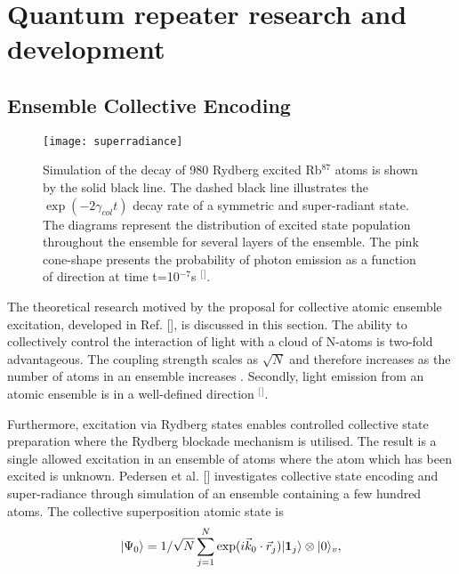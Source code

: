 \section{\label{sec:level1}Quantum repeater research and development}

\subsection{\label{subsec:level1}Ensemble Collective Encoding}

\begin{figure}[b]
\centering
\texttt{[image: superradiance]}
\caption{\label{fig:superradiance} Simulation of the decay of 980 Rydberg excited Rb$^{87}$ atoms is shown by the solid black line. The dashed black line illustrates the $\exp(-2\gamma_{col}t)$ decay rate of a symmetric and super-radiant state. The diagrams represent the distribution of excited state population throughout the ensemble for several layers of the ensemble. The pink cone-shape presents the probability of photon emission as a function of direction at time t=10$^{-7}$s
$^{[}$\citep{Pedersen2009FewEncoding}$^{]}$.}
\end{figure}

\noindent The theoretical research motived by the proposal for collective atomic ensemble excitation, developed in Ref. [], is discussed in this section. The ability to collectively control the interaction of light with a cloud of N-atoms is two-fold advantageous. The coupling strength scales as $\sqrt{N}$ and therefore increases as the number of atoms in an ensemble increases \citep{Hammerer2010QuantumEnsembles}. Secondly, light emission from an atomic ensemble is in a well-defined direction $^{[}$\citep{Duan2001Long-distanceOptics}$^{]}$.

Furthermore, excitation via Rydberg states enables controlled collective state preparation where the Rydberg blockade mechanism is utilised. The result is a single allowed excitation in an ensemble of atoms where the atom which has been excited is unknown. Pedersen et al. [] investigates collective state encoding and super-radiance through simulation of an ensemble containing a few hundred atoms. The collective superposition atomic state is
\begin{equation}
\label{eq:collectiveencodingstate}
\lvert\Psi_{0}\rangle=1/\sqrt{N}\sum_{j=1}^{N} \exp(i \vec{k}_{0} \cdot \vec{r}_{j})\lvert\textbf{1}_{j}\rangle \otimes \lvert0\rangle_{v},
\end{equation}

